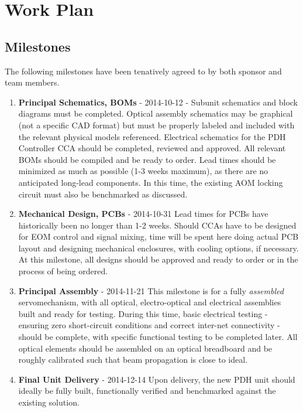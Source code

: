 \newpage
\section{Work Plan}

\subsection{Milestones} %

The following milestones have been tenatively agreed to by both sponsor and
team members.

\begin{enumerate}
  \item{\textbf{Principal Schematics, BOMs} - 2014-10-12} - Subunit schematics
  and block diagrams must be completed. Optical assembly schematics may be
  graphical (not a specific CAD format) but must be properly labeled and
  included with the relevant physical models referenced. Electrical schematics
  for the PDH Controller CCA should be completed, reviewed and approved. All
  relevant BOMs should be compiled and be ready to order. Lead times should be
  minimized as much as possible (1-3 weeks maximum), as there are no
  anticipated long-lead components. In this time, the existing AOM locking
  circuit must also be benchmarked as discussed.
  \item{\textbf{Mechanical Design, PCBs} - 2014-10-31} Lead times for PCBs have
  historically been no longer than 1-2 weeks. Should CCAs have to be designed
  for EOM control and signal mixing, time will be spent here doing actual PCB
  layout and designing mechanical enclosures, with cooling options, if necessary.
  At this milestone, all designs should be approved and ready to order or in the
  process of being ordered.
  \item{\textbf{Principal Assembly} - 2014-11-21}  This milestone is for a
  fully \emph{assembled} servomechanism, with all optical, electro-optical and
  electrical assemblies built and ready for testing. During this time,
  basic electrical testing - ensuring zero short-circuit conditions and correct
  inter-net connectivity - should be complete, with specific functional testing
  to be completed later. All optical elements should be assembled on an optical
  breadboard and be roughly calibrated such that beam propagation is close to
  ideal.
  \item{\textbf{Final Unit Delivery} - 2014-12-14} Upon delivery, the
  new PDH unit should ideally be fully built, functionally verified and
  benchmarked against the existing solution.
\end{enumerate}

